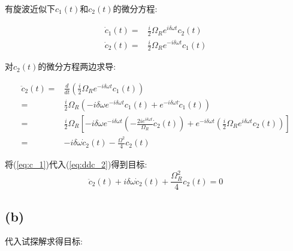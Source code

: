 \documentclass[twoside]{article}
\begin{document}
有旋波近似下$c_1(t)$和$c_2(t)$的微分方程:

\begin{align}
    \dot{c}_1(t) = & \frac{i}{2} \Omega_R e^{i\delta\omega t} c_2(t)  \label{eq:c_1} \\
    \dot{c}_2(t) = & \frac{i}{2} \Omega_R e^{-i\delta\omega t} c_1(t)
\end{align}

对$c_2(t)$的微分方程两边求导:

\begin{equation} \label{eq:ddc_2}
    \begin{split}
        \ddot{c}_2(t) = & \frac{d}{dt} \left(\frac{i}{2}\Omega_R e^{-i\delta\omega t} c_1 (t)\right)                                                                                                                                                      \\
        =               & \frac{i}{2} \Omega_R \left(-i\delta \omega e^{-i\delta\omega t} c_1 (t) + e^{-i\delta\omega t} \dot{c}_1 (t)\right)                                                                                                             \\
        =               & \frac{i}{2} \Omega_R \left[-i\delta \omega e^{-i\delta\omega t} \left(-\frac{2ie^{i\delta \omega t}}{\Omega_R} \dot{c}_2 (t)\right) + e^{-i\delta\omega t} \left(\frac{i}{2}\Omega_R e^{i\delta \omega t} c_2(t)\right) \right] \\
        =               & -i\delta \omega \dot{c}_2(t) - \frac{\Omega^2}{4} c_2(t)
    \end{split}
\end{equation}


将(\ref{eq:c_1})代入(\ref{eq:ddc_2})得到目标:
\begin{equation*}
    \ddot{c}_2(t) + i\delta \omega \dot{c}_2(t) + \frac{\Omega_R^2}{4} c_2(t) = 0
\end{equation*}

\subsection*{(b)}
代入试探解求得目标:
\end{document}
